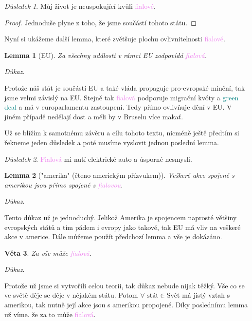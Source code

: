 \documentclass[12pt, a4paper]{article}
\theoremstyle{plain}
\newtheorem{veta}{Věta}
\newtheorem{lemma}[veta]{Lemma}
\theoremstyle{plain}
\theoremstyle{remark}
\newtheorem*{dusl}{Důsledek}
\newenvironment{dukaz}{
	\par\medskip\noindent
	\textit{Důkaz}.
}{
	\newline
	\rightline{$\qedsymbol$}
}
\newcommand{\fialova}[1]{\textcolor{violet}{fialov#1}}
\begin{document}
	\begin{dusl}
		Můj život je neuspokující kvůli \fialova{é}.
	\end{dusl}
	
	\begin{proof}
		Jednoduše plyne z toho, že jsme součástí tohoto státu.
	\end{proof}
	
	Nyní si ukážeme další lemma, které zvětšuje plochu ovlivnitelnosti \fialova{é}.
	
	\begin{lemma}[EU]
		Za všechny události v rámci EU zodpovídá \fialova{á}.
	\end{lemma}
	
	\begin{dukaz}
		Protože náš stát je součástí EU a také vláda propaguje pro-evropské mínění, tak jsme velmi závislý na EU. Stejně tak \fialova{á} podporuje migrační kvóty a \textcolor{teal}{green deal} a má v europarlamentu zastoupení. Tedy přímo ovlivňuje dění v EU. V jiném případě nedělají dost a měli by v Bruselu více makať.
	\end{dukaz}
	
	Už se blížím k samotnému závěru a cílu tohoto textu, nicméně ještě předtím si řekneme jeden důsledek a poté musíme vyslovit jednou poslední lemma.
	
	\begin{dusl}
		\textcolor{violet}{Fialová} mi nutí elektrické auto a úsporné nesmysli.
	\end{dusl}
	
	\begin{lemma}["amerika" (čteno americkým přízvukem)]
		Veškeré akce spojené s amerikou jsou přímo spojené s \fialova{ou}.
	\end{lemma}
	
	\begin{dukaz}
		Tento důkaz už je jednoduchý. Jelikož Amerika je spojencem naprosté většiny evropských států a tím pádem i evropy jako takové, tak EU má vliv na veškeré akce v americe. Dále můžeme použít předchozí lemma a vše je dokázáno.
	\end{dukaz}
	
	\begin{veta}
		Za vše může \fialova{á}.
	\end{veta}
	
	\begin{dukaz}
		Protože už jsme si vytvořili celou teorii, tak důkaz nebude nijak těžký. Vše co se ve světě děje se děje v nějakém státu. Potom $\forall \text{ stát} \in \text{Svět}$ má jistý vztah s amerikou, tak nutně její akce jsou s amerikou propojené. Díky poslednímu lemma už víme. že za to může \fialova{á}.
	\end{dukaz}
	
\end{document}
